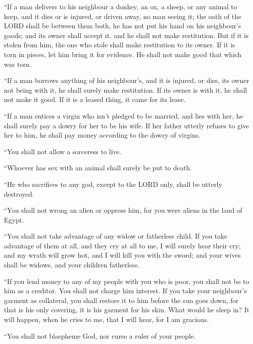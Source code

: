  ``If a man delivers to his neighbour a donkey, an ox, a
sheep, or any animal to keep, and it dies or is injured, or driven away,
no man seeing it;  the oath of the LORD shall be between
them both, he has not put his hand on his neighbour's goods; and its
owner shall accept it, and he shall not make restitution.
 But if it is stolen from him, the one who stole shall
make restitution to its owner.  If it is torn in pieces,
let him bring it for evidence. He shall not make good that which was
torn.

 ``If a man borrows anything of his neighbour's, and it
is injured, or dies, its owner not being with it, he shall surely make
restitution.  If its owner is with it, he shall not make
it good. If it is a leased thing, it came for its lease.

 ``If a man entices a virgin who isn't pledged to be
married, and lies with her, he shall surely pay a dowry for her to be
his wife.  If her father utterly refuses to give her to
him, he shall pay money according to the dowry of virgins.

 ``You shall not allow a sorceress to live.

 ``Whoever has sex with an animal shall surely be put to
death.

 ``He who sacrifices to any god, except to the LORD only,
shall be utterly destroyed.

 ``You shall not wrong an alien or oppress him, for you
were aliens in the land of Egypt.

 ``You shall not take advantage of any widow or
fatherless child.  If you take advantage of them at all,
and they cry at all to me, I will surely hear their cry; 
and my wrath will grow hot, and I will kill you with the sword; and your
wives shall be widows, and your children fatherless.

 ``If you lend money to any of my people with you who is
poor, you shall not be to him as a creditor. You shall not charge him
interest.  If you take your neighbour's garment as
collateral, you shall restore it to him before the sun goes down,
 for that is his only covering, it is his garment for his
skin. What would he sleep in? It will happen, when he cries to me, that
I will hear, for I am gracious.

 ``You shall not blaspheme God, nor curse a ruler of your
people.


